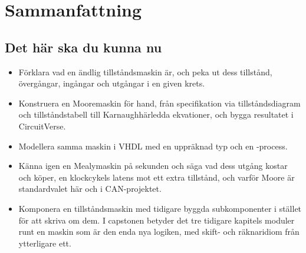 
\section{Sammanfattning}
\label{c8:sec:review}

\subsection*{Det här ska du kunna nu}
\begin{itemize}
  \item Förklara vad en ändlig tillståndsmaskin är, och peka ut dess tillstånd, övergångar,
    ingångar och utgångar i en given krets.
  \item Konstruera en Mooremaskin för hand, från specifikation via tillståndsdiagram och
    tillståndstabell till Karnaughhärledda ekvationer, och bygga resultatet i CircuitVerse.
  \item Modellera samma maskin i VHDL med en uppräknad typ  och en
    -process.
  \item Känna igen en Mealymaskin på sekunden och säga vad dess utgång kostar och köper, en
    klockcykels latens mot ett extra tillstånd, och varför Moore är standardvalet här och i
    CAN-projektet.
  \item Komponera en tillståndsmaskin med tidigare byggda subkomponenter i stället för att skriva
    om dem. I capstonen betyder det tre tidigare kapitels moduler runt en maskin som är den enda
    nya logiken, med skift- och räknaridiom från ytterligare ett.
\end{itemize}

